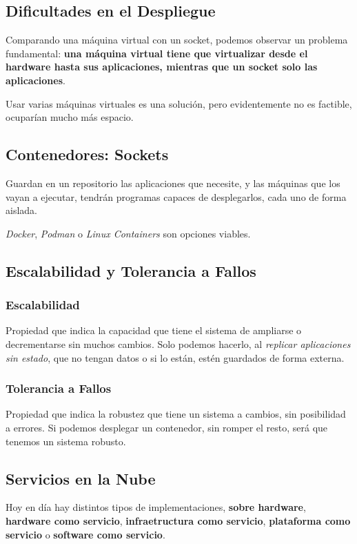 \subsection{Dificultades en el Despliegue}
Comparando una máquina virtual con un socket, podemos observar un problema fundamental: \textbf{una máquina virtual tiene que virtualizar desde el hardware hasta sus aplicaciones, mientras que un socket solo las aplicaciones}.
\par Usar varias máquinas virtuales es una solución, pero evidentemente no es factible, ocuparían mucho más espacio.
\subsection{Contenedores: Sockets}
Guardan en un repositorio las aplicaciones que necesite, y las máquinas que los vayan a ejecutar, tendrán programas capaces de desplegarlos, cada uno de forma aislada.
\par \textit{Docker}, \textit{Podman} o \textit{Linux Containers} son opciones viables.
\subsection{Escalabilidad y Tolerancia a Fallos}
\subsubsection{Escalabilidad}
Propiedad que indica la capacidad que tiene el sistema de ampliarse o decrementarse sin muchos cambios. Solo podemos hacerlo, al \textit{replicar aplicaciones sin estado}, que no tengan datos o si lo están, estén guardados de forma externa.
\subsubsection{Tolerancia a Fallos}
Propiedad que indica la robustez que tiene un sistema a cambios, sin posibilidad a errores. Si podemos desplegar un contenedor, sin romper el resto, será que tenemos un sistema robusto.
\subsection{Servicios en la Nube}
Hoy en día hay distintos tipos de implementaciones, \textbf{sobre hardware}, \textbf{hardware como servicio}, \textbf{infraetructura como servicio}, \textbf{plataforma como servicio} o \textbf{software como servicio}.